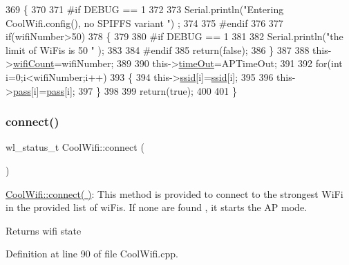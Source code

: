 \begin{DoxyCode}
369 \{
370 
371 \textcolor{preprocessor}{#if DEBUG == 1 }
372     
373     Serial.println(\textcolor{stringliteral}{"Entering CoolWifi.config(), no SPIFFS variant "}) ;
374     
375 \textcolor{preprocessor}{#endif}
376     
377     \textcolor{keywordflow}{if}(wifiNumber>50)
378     \{
379     
380 \textcolor{preprocessor}{    #if DEBUG == 1 }
381         
382         Serial.println(\textcolor{stringliteral}{"the limit of WiFis is 50 "} );
383         
384 \textcolor{preprocessor}{    #endif}
385         \textcolor{keywordflow}{return}(\textcolor{keyword}{false});  
386     \}
387 
388     this->\hyperlink{classCoolWifi_ab133bd92fcb895b884deecd6678592e4}{wifiCount}=wifiNumber;
389 
390     this->\hyperlink{classCoolWifi_a952111605f25156588b5632caaba1c6f}{timeOut}=APTimeOut;
391     
392     \textcolor{keywordflow}{for}(\textcolor{keywordtype}{int} i=0;i<wifiNumber;i++)
393     \{
394         this->\hyperlink{classCoolWifi_a893b21d0fed821438733bba2e73fb4c2}{ssid}[i]=\hyperlink{classCoolWifi_a893b21d0fed821438733bba2e73fb4c2}{ssid}[i];
395         
396         this->\hyperlink{classCoolWifi_a0c3332a149245aaad060b32593a54c9b}{pass}[i]=\hyperlink{classCoolWifi_a0c3332a149245aaad060b32593a54c9b}{pass}[i];
397     \}
398         
399     \textcolor{keywordflow}{return}(\textcolor{keyword}{true});
400 
401 \}
\end{DoxyCode}
\mbox{\label{classCoolWifi_ad060353050f40d032a2dbf9e54a768bf}} 
\subsubsection{\texorpdfstring{connect()}{connect()}}
{\footnotesize\ttfamily wl\+\_\+status\+\_\+t Cool\+Wifi\+::connect (\begin{DoxyParamCaption}{ }\end{DoxyParamCaption})}

\hyperlink{classCoolWifi_ad060353050f40d032a2dbf9e54a768bf}{Cool\+Wifi\+::connect( )}\+: This method is provided to connect to the strongest Wi\+Fi in the provided list of wi\+Fis. If none are found , it starts the AP mode.

\begin{DoxyReturn}{Returns}
wifi state 
\end{DoxyReturn}


Definition at line 90 of file Cool\+Wifi.\+cpp.



